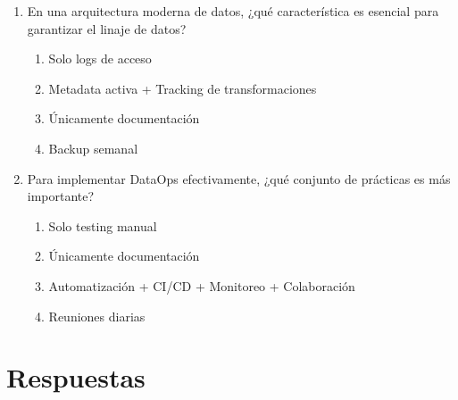 \documentclass[12pt]{article}
\begin{document}
\begin{enumerate}[label=\arabic*.]
\item En una arquitectura moderna de datos, ¿qué característica es esencial para garantizar el linaje de datos?
\begin{enumerate}
    \item Solo logs de acceso
    \item Metadata activa + Tracking de transformaciones
    \item Únicamente documentación
    \item Backup semanal
\end{enumerate}

\item Para implementar DataOps efectivamente, ¿qué conjunto de prácticas es más importante?
\begin{enumerate}
    \item Solo testing manual
    \item Únicamente documentación
    \item Automatización + CI/CD + Monitoreo + Colaboración
    \item Reuniones diarias
\end{enumerate}

\end{enumerate}

\newpage
\section*{Respuestas}
\end{document}
